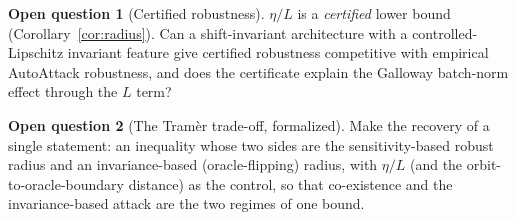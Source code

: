 \documentclass[11pt]{article}
\theoremstyle{plain}
\theoremstyle{definition}
\newtheorem{question}{Open question}
\theoremstyle{remark}
\begin{document}
\begin{question}[Certified robustness]
$\eta/L$ is a \emph{certified} lower bound (Corollary~\ref{cor:radius}). Can a shift-invariant architecture with a controlled-Lipschitz invariant feature give certified robustness competitive with empirical AutoAttack robustness, and does the certificate explain the Galloway batch-norm effect through the $L$ term?
\end{question}

\begin{question}[The Tramèr trade-off, formalized]
Make the recovery of \citet{tramer2020fundamental} a single statement: an inequality whose two sides are the sensitivity-based robust radius and an invariance-based (oracle-flipping) radius, with $\eta/L$ (and the orbit-to-oracle-boundary distance) as the control, so that co-existence and the invariance-based attack are the two regimes of one bound.
\end{question}
\end{document}
